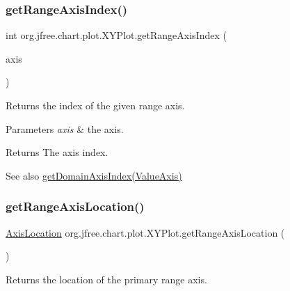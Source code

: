 \subsubsection{\texorpdfstring{get\+Range\+Axis\+Index()}{getRangeAxisIndex()}}
{\footnotesize\ttfamily int org.\+jfree.\+chart.\+plot.\+X\+Y\+Plot.\+get\+Range\+Axis\+Index (\begin{DoxyParamCaption}\item[{\mbox{\hyperlink{classorg_1_1jfree_1_1chart_1_1axis_1_1_value_axis}{Value\+Axis}}}]{axis }\end{DoxyParamCaption})}

Returns the index of the given range axis.


\begin{DoxyParams}{Parameters}
{\em axis} & the axis.\\
\hline
\end{DoxyParams}
\begin{DoxyReturn}{Returns}
The axis index.
\end{DoxyReturn}
\begin{DoxySeeAlso}{See also}
\mbox{\hyperlink{classorg_1_1jfree_1_1chart_1_1plot_1_1_x_y_plot_a9ffdbf54f2afe3ebcf1bd03410828f76}{get\+Domain\+Axis\+Index(\+Value\+Axis)}} 
\end{DoxySeeAlso}
\mbox{\label{classorg_1_1jfree_1_1chart_1_1plot_1_1_x_y_plot_a6fb19e12902c04095a10b90a2c22dc05}} 
\subsubsection{\texorpdfstring{get\+Range\+Axis\+Location()}{getRangeAxisLocation()}\hspace{0.1cm}{\footnotesize\ttfamily [1/2]}}
{\footnotesize\ttfamily \mbox{\hyperlink{classorg_1_1jfree_1_1chart_1_1axis_1_1_axis_location}{Axis\+Location}} org.\+jfree.\+chart.\+plot.\+X\+Y\+Plot.\+get\+Range\+Axis\+Location (\begin{DoxyParamCaption}{ }\end{DoxyParamCaption})}

Returns the location of the primary range axis.

